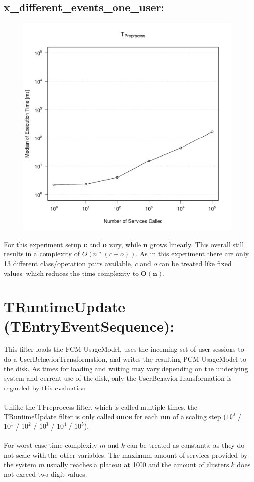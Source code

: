 \documentclass[10pt,a4paper]{article}
\begin{document}
	\subsection{x\_different\_events\_one\_user:}
	\begin{figure}[H]
		\centering
		\includegraphics[scale=0.7]{graphics/TPreprocess_median_different_events.pdf}
	\end{figure}
	For this experiment setup $\mathbf{c}$ and $\mathbf{o}$ vary, while $\mathbf{n}$ grows linearly. This overall still results in a complexity of $O(n * (c + o))$. As in this experiment there are only 13 different class/operation pairs available, $c$ and $o$ can be treated like fixed values, which reduces the time complexity to $\mathbf{O(n)}$.
	\newpage
	\section{TRuntimeUpdate (TEntryEventSequence):}
	This filter loads the PCM UsageModel, uses the incoming set of user sessions to do a UserBehaviorTransformation, and writes the resulting PCM UsageModel to the disk. As times for loading and writing may vary depending on the underlying system and current use of the disk, only the UserBehaviorTransformation is regarded by this evaluation.\\
	\\
	Unlike the TPreprocess filter, which is called multiple times, the TRuntimeUpdate filter is only called \textbf{once} for each run of a scaling step ($10^0$ / $10^1$ / $10^2$ / $10^3$ / $10^4$ / $10^5$).\\
	\\
	For worst case time complexity $m$ and $k$ can be treated as constants, as they do not scale with the other variables. The maximum amount of services provided by the system $m$ usually reaches a plateau at 1000 and the amount of clusters $k$ does not exceed two digit values.
\end{document}
